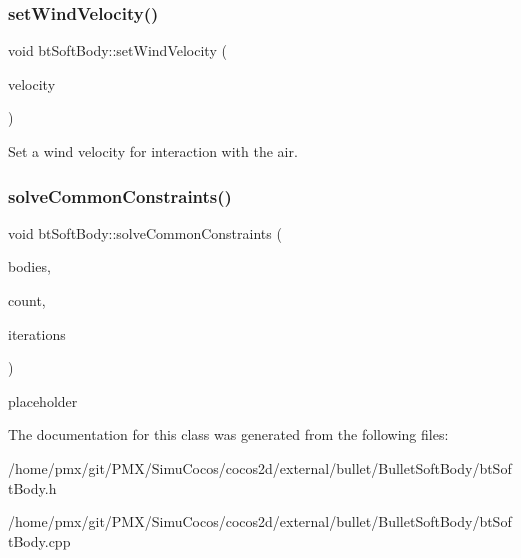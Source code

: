 \subsubsection{\texorpdfstring{set\+Wind\+Velocity()}{setWindVelocity()}}
{\footnotesize\ttfamily void bt\+Soft\+Body\+::set\+Wind\+Velocity (\begin{DoxyParamCaption}\item[{const bt\+Vector3 \&}]{velocity }\end{DoxyParamCaption})}

Set a wind velocity for interaction with the air. \mbox{\label{classbtSoftBody_ae8a2fc459b2afc985fbb03c1b0203bec}} 
\subsubsection{\texorpdfstring{solve\+Common\+Constraints()}{solveCommonConstraints()}}
{\footnotesize\ttfamily void bt\+Soft\+Body\+::solve\+Common\+Constraints (\begin{DoxyParamCaption}\item[{\hyperlink{classbtSoftBody}{bt\+Soft\+Body} $\ast$$\ast$}]{bodies,  }\item[{int}]{count,  }\item[{int}]{iterations }\end{DoxyParamCaption})\hspace{0.3cm}{\ttfamily [static]}}

placeholder 

The documentation for this class was generated from the following files\+:\begin{DoxyCompactItemize}
\item 
/home/pmx/git/\+P\+M\+X/\+Simu\+Cocos/cocos2d/external/bullet/\+Bullet\+Soft\+Body/bt\+Soft\+Body.\+h\item 
/home/pmx/git/\+P\+M\+X/\+Simu\+Cocos/cocos2d/external/bullet/\+Bullet\+Soft\+Body/bt\+Soft\+Body.\+cpp\end{DoxyCompactItemize}
